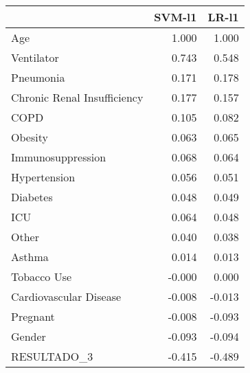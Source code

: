 \begin{tabular}{lrr}
\toprule
{} &  SVM-l1 &  LR-l1 \\
\midrule
Age                         &   1.000 &  1.000 \\
Ventilator                  &   0.743 &  0.548 \\
Pneumonia                   &   0.171 &  0.178 \\
Chronic Renal Insufficiency &   0.177 &  0.157 \\
COPD                        &   0.105 &  0.082 \\
Obesity                     &   0.063 &  0.065 \\
Immunosuppression           &   0.068 &  0.064 \\
Hypertension                &   0.056 &  0.051 \\
Diabetes                    &   0.048 &  0.049 \\
ICU                         &   0.064 &  0.048 \\
Other                       &   0.040 &  0.038 \\
Asthma                      &   0.014 &  0.013 \\
Tobacco Use                 &  -0.000 &  0.000 \\
Cardiovascular Disease      &  -0.008 & -0.013 \\
Pregnant                    &  -0.008 & -0.093 \\
Gender                      &  -0.093 & -0.094 \\
RESULTADO\_3                 &  -0.415 & -0.489 \\
\bottomrule
\end{tabular}
